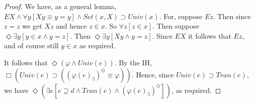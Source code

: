 \documentclass{article}
\begin{document}
\begin{proof}
        We have, as a general lemma,
        $EX \wedge \forall y[Xy \equiv y = y] \wedge Set(x, X) \supset Univ(x)$.
        For, suppose $Ez$. Then since $z = z$ we get $Xz$ and hence $z \in x$. So 
        $\forall z[z \in x]$. Then suppose $\Diamond \exists y[y \in x \wedge y = z]$. 
        Then $\Diamond \exists y[Xy \wedge y = z]$. Since $EX$ it follows that $Ez$, 
        and of course still $y \in x$ as required.
    
        It follows that $\Diamond (\varphi \wedge Univ(e))$. By the IH, 
        $\Box (Univ(e) \supset ((\varphi(e)_\exists)^\Diamond \equiv \varphi))$. Hence,
        since $Univ(e) \supset Tran(e)$, we have 
        $\Diamond (\exists e[e  \supseteq d \wedge Tran(e) \wedge (\varphi(e)_\exists)^\Diamond])$,
        as required.
    
        
    

    \end{proof}
    
\end{document}
